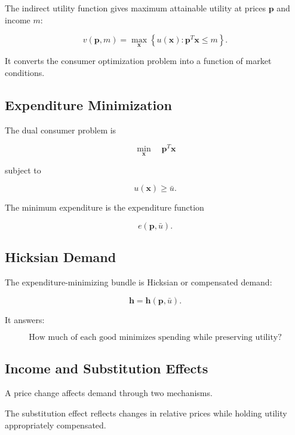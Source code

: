 The indirect utility function gives maximum attainable utility at prices
\(\mathbf{p}\) and income \(m\):

\[
\boxed{
v(\mathbf{p},m)
=
\max_{\mathbf{x}}
\left\{
u(\mathbf{x})
:
\mathbf{p}^T\mathbf{x}\leq m
\right\}.
}
\]

It converts the consumer optimization problem into a function of market
conditions.

\subsection{Expenditure Minimization}
\label{subsec:expenditure-minimization}

The dual consumer problem is

\[
\boxed{
\min_{\mathbf{x}}
\quad
\mathbf{p}^T\mathbf{x}
}
\]

subject to

\[
\boxed{
u(\mathbf{x})
\geq
\bar u.
}
\]

The minimum expenditure is the expenditure function

\[
\boxed{
e(\mathbf{p},\bar u).
}
\]

\subsection{Hicksian Demand}
\label{subsec:hicksian-demand}

The expenditure-minimizing bundle is Hicksian or compensated demand:

\[
\boxed{
\mathbf{h}
=
\mathbf{h}(\mathbf{p},\bar u).
}
\]

It answers:

\[
\boxed{
\text{How much of each good minimizes spending while preserving utility?}
}
\]

\subsection{Income and Substitution Effects}
\label{subsec:income-substitution-effects}

A price change affects demand through two mechanisms.

The substitution effect reflects changes in relative prices while holding
utility appropriately compensated.

